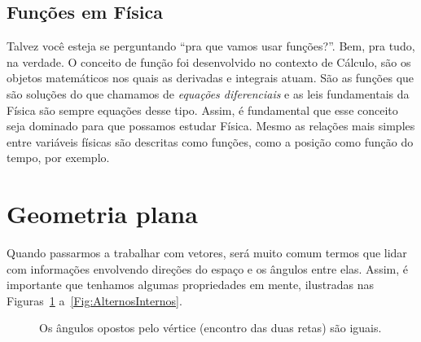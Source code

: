 \subsection{Funções em Física}

Talvez você esteja se perguntando ``pra que vamos usar funções?''. Bem, pra tudo, na verdade. O conceito de função foi desenvolvido no contexto de Cálculo, são os objetos matemáticos nos quais as derivadas e integrais atuam. São as funções que são soluções do que chamamos de \emph{equações diferenciais} e as leis fundamentais da Física são sempre equações desse tipo. Assim, é fundamental que esse conceito seja dominado para que possamos estudar Física. Mesmo as relações mais simples entre variáveis físicas são descritas como funções, como a posição como função do tempo, por exemplo.

\section{Geometria plana}

Quando passarmos a trabalhar com vetores, será muito comum termos que lidar com informações envolvendo direções do espaço e os ângulos entre elas. Assim, é importante que tenhamos algumas propriedades em mente, ilustradas nas Figuras~\ref{Fig:PropAngulosRetas1} a~\ref{Fig:AlternosInternos}.
\begin{figure}
\centering
{}
\caption{Os ângulos opostos pelo vértice (encontro das duas retas) são iguais. \label{Fig:PropAngulosRetas1}}
\end{figure}

